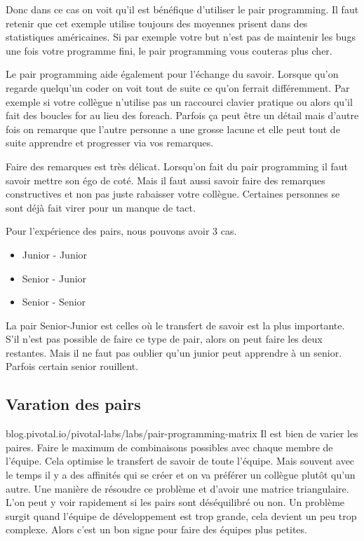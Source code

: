 \documentclass[journal, a4paper]{IEEEtran}
\begin{document}
Donc dans ce cas on voit qu’il est bénéfique d’utiliser le pair programming. Il faut retenir que cet
exemple utilise toujours des moyennes prisent dans des statistiques américaines. Si par exemple
votre but n’est pas de maintenir les bugs une fois votre programme fini, le pair programming vous
couteras plus cher.

Le pair programming aide également pour l’échange du savoir. Lorsque qu’on regarde quelqu’un
coder on voit tout de suite ce qu’on ferrait différemment. Par exemple si votre collègue n’utilise pas
un raccourci clavier pratique ou alors qu’il fait des boucles for au lieu des foreach. Parfois ça peut
être un détail mais d’autre fois on remarque que l’autre personne a une grosse lacune et elle peut
tout de suite apprendre et progresser via vos remarques.

Faire des remarques est très délicat. Lorsqu’on fait du pair programming il faut savoir mettre son égo
de coté. Mais il faut aussi savoir faire des remarques constructives et non pas juste rabaisser votre
collègue. Certaines personnes se sont déjà fait virer pour un manque de tact.

Pour l’expérience des pairs, nous pouvons avoir 3 cas.

\begin{itemize}
  \item Junior - Junior
  \item Senior - Junior
  \item Senior - Senior
\end{itemize}

La pair Senior-Junior est celles où le transfert de savoir est la plus importante. S’il n’est pas possible
de faire ce type de pair, alors on peut faire les deux restantes. Mais il ne faut pas oublier qu’un junior
peut apprendre à un senior. Parfois certain senior rouillent.

\subsection{Varation des pairs}

blog.pivotal.io/pivotal-labs/labs/pair-programming-matrix
Il est bien de varier les paires. Faire le maximum de combinaisons possibles avec chaque membre de
l’équipe. Cela optimise le transfert de savoir de toute l’équipe. Mais souvent avec le temps il y a des
affinités qui se créer et on va préférer un collègue plutôt qu’un autre. Une manière de résoudre ce
problème et d’avoir une matrice triangulaire. L’on peut y voir rapidement si les pairs sont
déséquilibré ou non. Un problème surgit quand l’équipe de développement est trop grande, cela
devient un peu trop complexe. Alors c’est un bon signe pour faire des équipes plus petites.
\end{document}
